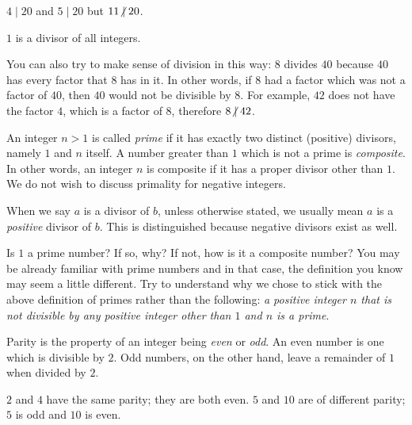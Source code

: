 \documentclass{subfile}
\begin{document}
	\begin{example}
		$4 \mid 20$ and $5 \mid 20$ but $11\centernot\mid 20$.
	\end{example}

	\begin{example}
		$1$ is a divisor of all integers.
	\end{example}

	You can also try to make sense of division in this way: $8$ divides $40$ because $40$ has every factor that $8$ has in it. In other words, if $8$ had a factor which was not a factor of $40$, then $40$ would not be divisible by $8$. For example, $42$ does not have the factor $4$, which is a factor of $8$, therefore $8 \centernot\mid 42$.

	\begin{definition}
		An integer $n>1$ is called \textit{prime} if it has exactly two distinct (positive) divisors, namely $1$ and $n$ itself. A number greater than $1$ which is not a prime is \textit{composite}. In other words, an integer $n$ is composite if it has a proper divisor other than $1$. We do not wish to discuss primality for negative integers.
	\end{definition}

	\begin{note}
		When we say $a$ is a divisor of $b$, unless otherwise stated, we usually mean $a$ is a \textit{positive} divisor of $b$. This is distinguished because negative divisors exist as well.
	\end{note}

	\begin{question}
		Is $1$ a prime number? If so, why? If not, how is it a composite number? You may be already familiar with prime numbers and in that case, the definition you know may seem a little different. Try to understand why we chose to stick with the above definition of primes rather than the following: \textit{a positive integer $n$ that is not divisible by any positive integer other than $1$ and $n$ is a prime}.
	\end{question}

	\begin{definition}[Parity]
		Parity is the property of an integer being \textit{even} or \textit{odd}. An even number is one which is divisible by $2$. Odd numbers, on the other hand, leave a remainder of $1$ when divided by $2$.
	\end{definition}

	\begin{example}
		$2$ and $4$ have the same parity; they are both even. $5$ and $10$ are of different parity; $5$ is odd and $10$ is even.
	\end{example}
\end{document}
